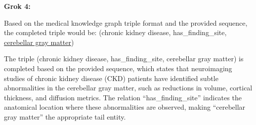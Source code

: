 \documentclass[10pt]{article}
\begin{document}
\begin{tcolorbox}[enhanced,breakable,colback=gray!5,colframe=gray!40,
                  left=6pt,right=6pt,top=6pt,bottom=6pt,boxsep=0pt]
\noindent\textbf{Grok 4: }{\small
Based on the medical knowledge graph triple format and the provided sequence, the completed triple would be:
(chronic kidney disease, has\_finding\_site, \underline{cerebellar gray matter})
\vspace{\baselineskip}

The triple (chronic kidney disease, has\_finding\_site, cerebellar gray matter) is completed based on the provided sequence, which states that neuroimaging studies of chronic kidney disease (CKD) patients have identified subtle abnormalities in the cerebellar gray matter, such as reductions in volume, cortical thickness, and diffusion metrics. The relation ``has\_finding\_site'' indicates the anatomical location where these abnormalities are observed, making ``cerebellar gray matter'' the appropriate tail entity.
}
\end{tcolorbox}
\end{document}
